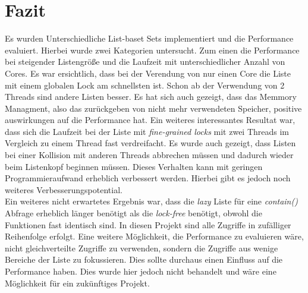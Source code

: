 \section{Fazit}
Es wurden Unterschiedliche List-baset Sets implementiert und die Performance evaluiert.
Hierbei wurde zwei Kategorien untersucht. Zum einen die Performance bei steigender Listengröße und
die Laufzeit mit unterschiedlicher Anzahl von Cores. 
Es war ersichtlich, dass bei der Verendung von nur einen Core die Liste mit 
einem globalen Lock am schnellsten ist. Schon ab der Verwendung von 2 Threads sind
andere Listen besser. Es hat sich auch gezeigt, dass das Memmory Managment, also das zurückgeben
von nicht mehr verwendeten Speicher, positive auswirkungen auf die Performance hat. Ein weiteres
interessantes Resultat war, dass sich die Laufzeit bei der Liste mit \textit{fine-grained locks} mit zwei Threads 
im Vergleich zu einem Thread fast verdreifacht. Es wurde auch gezeigt, dass Listen bei einer Kollision
mit anderen Threads abbrechen müssen und dadurch wieder beim Listenkopf beginnen müssen. 
Dieses Verhalten kann mit geringen Programmieraufwand erheblich verbessert werden. Hierbei 
gibt es jedoch noch weiteres Verbesserungspotential. \\
Ein weiteres nicht erwartetes Ergebnis war, dass die \textit{lazy} Liste für eine \textit{contain()} Abfrage
erheblich länger benötigt als die \textit{lock-free} benötigt, obwohl die Funktionen fast identisch sind. 
In diesen Projekt sind alle Zugriffe in zufälliger Reihenfolge erfolgt. Eine weitere Möglichkeit, die Performance
zu evaluieren wäre, nicht gleichverteilte Zugriffe zu verwenden, sondern die Zugriffe aus wenige Bereiche der Liste zu fokussieren. Dies sollte durchaus einen Einfluss auf die Performance haben.
Dies wurde hier jedoch nicht behandelt und wäre eine Möglichkeit für ein zukünftiges Projekt.